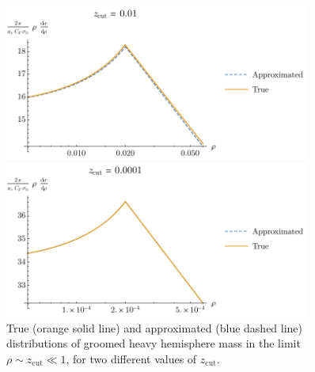 \documentclass[../thesis.tex]{subfiles}
\providecommand{\zcut}{z_\mathrm{{cut}}}
\begin{document}
	\begin{figure}
	\begin{center}
		\includegraphics[width=0.9\textwidth]{figures/approximation_small_zcut_0.01.pdf}

		\vspace{1cm}

		\includegraphics[width=0.9\textwidth]{figures/approximation_small_zcut_0.0001.pdf}

		\caption{\label{leading-fig:fixed order approx}True (orange solid line) and approximated (blue dashed line) distributions of groomed heavy hemisphere mass in the limit $\rho \sim \zcut \ll 1$, for two different values of $\zcut$.}
	\end{center}
	\end{figure}
\end{document}
